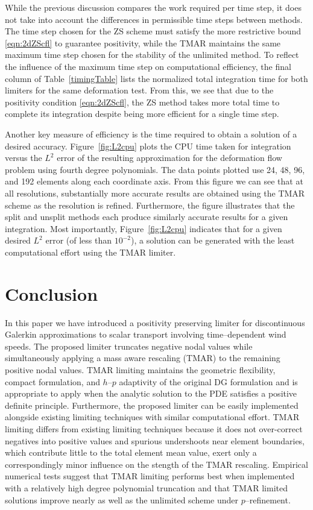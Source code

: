 \documentclass{ametsoc}
\begin{document}
While the previous discussion compares the work required per time step, it does not take into account the differences in permissible time steps between methods. The time step chosen for the ZS scheme must satisfy the more restrictive bound \eqref{eqn:2dZScfl} to guarantee positivity, while the TMAR maintains the same maximum time step chosen for the stability of the unlimited method. To reflect the influence of the maximum time step on computational efficiency, the final column of Table~\ref{timingTable} lists the normalized total integration time for both limiters for the same deformation test. From this, we see that due to the positivity condition \eqref{eqn:2dZScfl}, the ZS method takes more total time to complete its integration despite being more efficient for a single time step.

Another key measure of efficiency is the time required to obtain a solution of a desired accuracy. Figure~\ref{fig:L2cpu} plots the CPU time taken for integration versus the $L^2$ error of the resulting approximation for the deformation flow problem using fourth degree polynomials. The data points plotted use 24, 48, 96, and 192 elements along each coordinate axis. From this figure we can see that at all resolutions, substantially more accurate results are obtained using the TMAR scheme as the resolution is refined. Furthermore, the figure illustrates that the split and unsplit methods each produce similarly accurate results for a given integration. Most importantly, Figure~\ref{fig:L2cpu} indicates that for a given desired $L^2$ error (of less than $10^{-2}$), a solution can be generated with the least computational effort using the TMAR limiter. 

\section{Conclusion} \label{sec:conc}
In this paper we have introduced a positivity preserving limiter for discontinuous Galerkin approximations to scalar transport involving time--dependent wind speeds. The proposed limiter truncates negative nodal values while simultaneously applying a mass aware rescaling (TMAR) to the remaining positive nodal values. TMAR limiting maintains the geometric flexibility, compact formulation, and $h$--$p$ adaptivity of the original DG formulation and is appropriate to apply when the analytic solution to the PDE satisfies a positive definite principle. Furthermore, the proposed limiter can be easily implemented alongside existing limiting techniques with similar computational effort. TMAR limiting differs from existing limiting techniques because it does not over-correct negatives into positive values and spurious undershoots near element boundaries, which contribute little to the total element mean value, exert only a correspondingly minor influence on the stength of the TMAR rescaling. Empirical numerical tests suggest that TMAR limiting performs best when implemented with a relatively high degree polynomial truncation and that TMAR limited solutions improve nearly as well as the unlimited scheme under $p$--refinement.
\end{document}
